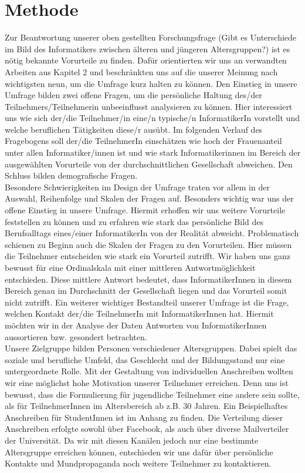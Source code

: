 \documentclass[de]{agse-empir-report}\usepackage[]{graphicx}\usepackage[]{color}
\begin{document}
\section[jk]{Methode}

Zur Beantwortung unserer oben gestellten Forschungsfrage (\glqq Gibt es Unterschiede im Bild des Informatikers zwischen älteren und jüngeren Altersgruppen?\grqq) ist es nötig bekannte Vorurteile zu finden. Dafür orientierten wir uns an verwandten Arbeiten aus Kapitel 2 und beschränkten uns auf die unserer Meinung nach wichtigsten neun, um die Umfrage kurz halten zu können. Den Einstieg in unsere Umfrage bilden zwei offene Fragen, um die persönliche Haltung des/der Teilnehmers/Teilnehmerin unbeeinflusst analysieren zu können. Hier interessiert uns wie sich der/die Teilnehmer/in eine/n typische/n InformatikerIn vorstellt und welche beruflichen Tätigkeiten diese/r ausübt. Im folgenden Verlauf des Fragebogens soll der/die TeilnehmerIn einschätzen wie hoch der Frauenanteil unter allen Informatiker/innen ist und wie stark Informatikerinnen im Bereich der ausgewählten Vorurteile von der durchschnittlichen Gesellschaft abweichen. Den Schluss bilden demografische Fragen. \\
Besondere Schwierigkeiten im Design der Umfrage traten vor allem in der Auswahl, Reihenfolge und Skalen der Fragen auf. Besonders wichtig war uns der offene Einstieg in unsere Umfrage. Hiermit erhoffen wir uns weitere Vorurteile feststellen zu können und zu erfahren wie stark das persönliche Bild des Berufsalltags eines/einer InformatikerIn von der Realität abweicht. Problematisch schienen zu Beginn auch die Skalen der Fragen zu den Vorurteilen. Hier müssen die Teilnehmer entscheiden wie stark ein Vorurteil zutrifft. Wir haben uns ganz bewusst für eine Ordinalskala mit einer mittleren Antwortmöglichkeit entschieden. Diese mittlere Antwort bedeutet, dass InformatikerInnen in diesem Bereich genau im Durchschnitt der Gesellschaft liegen und das Vorurteil somit nicht zutrifft. Ein weiterer wichtiger Bestandteil unserer Umfrage ist die Frage, welchen Kontakt der/die TeilnehmerIn mit InformatikerInnen hat. Hiermit möchten wir in der Analyse der Daten Antworten von InformatikerInnen aussortieren bzw. gesondert betrachten. \\
Unsere Zielgruppe bilden Personen verschiedener Altersgruppen. Dabei spielt das soziale und berufliche Umfeld, das Geschlecht und der Bildungsstand nur eine untergeordnete Rolle. Mit der Gestaltung von individuellen Anschreiben wollten wir eine möglichst hohe Motivation unserer Teilnehmer erreichen. Denn uns ist bewusst, dass die Formulierung für jugendliche Teilnehmer eine andere sein sollte, als für TeilnehmerInnen im Altersbereich ab z.B. 30 Jahren. Ein Beispielhaftes Anschreiben für StudentInnen ist im Anhang zu finden. Die Verteilung dieser Anschreiben erfolgte sowohl über Facebook, als auch über diverse Mailverteiler der Universität. Da wir mit diesen Kanälen jedoch nur eine bestimmte Altersgruppe erreichen können, entschieden wir uns dafür über persönliche Kontakte und Mundpropaganda noch weitere Teilnehmer zu kontaktieren.
\end{document}
